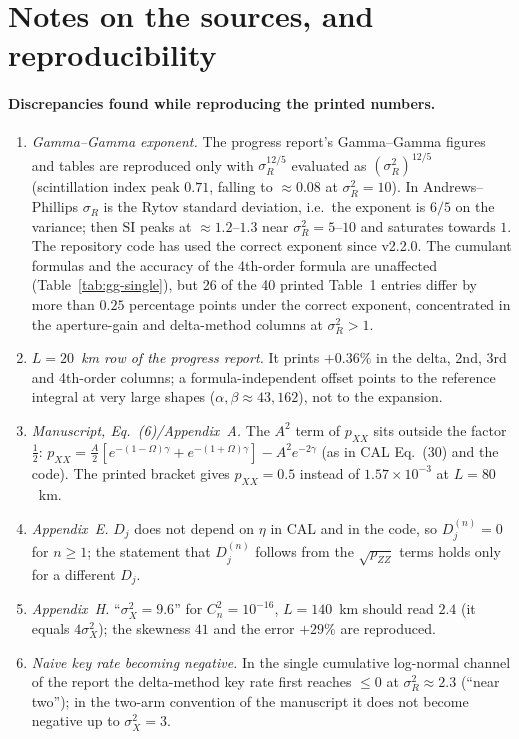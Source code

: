 \documentclass[11pt,a4paper]{article}
\theoremstyle{plain}
\theoremstyle{remark}
\begin{document}
\section{Notes on the sources, and reproducibility}
\label{sec:notes}
\paragraph{Discrepancies found while reproducing the printed numbers.}
\begin{enumerate}
\item \emph{Gamma--Gamma exponent.} The progress report's Gamma--Gamma figures and tables are reproduced only with $\sigma_R^{12/5}$ evaluated as $(\sigma_R^2)^{12/5}$ (scintillation index peak $0.71$, falling to $\approx0.08$ at $\sigma_R^2=10$). In Andrews--Phillips $\sigma_R$ is the Rytov standard deviation, i.e.\ the exponent is $6/5$ on the variance; then $\mathrm{SI}$ peaks at $\approx1.2$--$1.3$ near $\sigma_R^2=5$--$10$ and saturates towards $1$. The repository code has used the correct exponent since v2.2.0. The cumulant formulas and the accuracy of the 4th-order formula are unaffected (Table~\ref{tab:gg-single}), but 26 of the 40 printed Table~1 entries differ by more than $0.25$ percentage points under the correct exponent, concentrated in the aperture-gain and delta-method columns at $\sigma_R^2>1$.
\item \emph{$L=20$~km row of the progress report.} It prints $+0.36\%$ in the delta, 2nd, 3rd and 4th-order columns; a formula-independent offset points to the reference integral at very large shapes ($\alpha,\beta\approx43,162$), not to the expansion.
\item \emph{Manuscript, Eq.~(6)/Appendix~A.} The $A^2$ term of $p_{XX}$ sits outside the factor $\tfrac12$: $p_{XX}=\tfrac A2[e^{-(1-\Omega)\gamma}+e^{-(1+\Omega)\gamma}]-A^2e^{-2\gamma}$ (as in CAL Eq.~(30) and the code). The printed bracket gives $p_{XX}=0.5$ instead of $1.57\times10^{-3}$ at $L=80$~km.
\item \emph{Appendix~E.} $D_j$ does not depend on $\eta$ in CAL and in the code, so $D_j^{(n)}=0$ for $n\ge1$; the statement that $D_j^{(n)}$ follows from the $\sqrt{p_{ZZ}}$ terms holds only for a different $D_j$.
\item \emph{Appendix~H.} ``$\sigma_X^2=9.6$'' for $C_n^2=10^{-16}$, $L=140$~km should read $2.4$ (it equals $4\sigma_X^2$); the skewness $41$ and the error $+29\%$ are reproduced.
\item \emph{Naive key rate becoming negative.} In the single cumulative log-normal channel of the report the delta-method key rate first reaches $\le0$ at $\sigma_R^2\approx2.3$ (``near two''); in the two-arm convention of the manuscript it does not become negative up to $\sigma_X^2=3$.
\end{enumerate}
\end{document}
